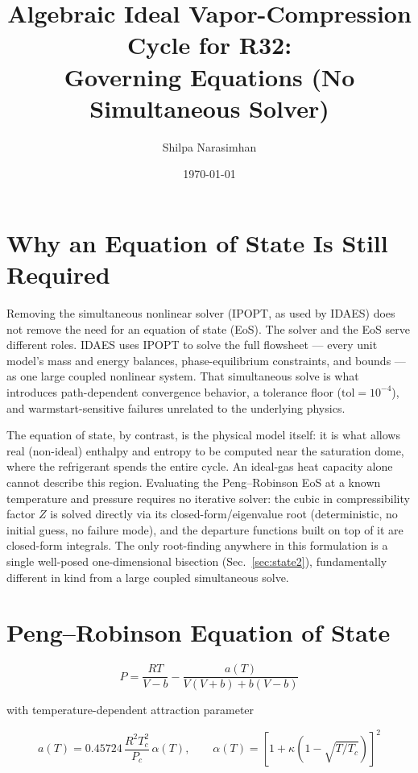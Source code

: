 \documentclass[11pt]{article}
\title{Algebraic Ideal Vapor-Compression Cycle for R32:\\
Governing Equations (No Simultaneous Solver)}
\author{Shilpa Narasimhan}
\date{\today}
\begin{document}
\maketitle

\section{Why an Equation of State Is Still Required}

Removing the simultaneous nonlinear solver (IPOPT, as used by IDAES) does not
remove the need for an equation of state (EoS). The solver and the EoS serve
different roles. IDAES uses IPOPT to solve the full flowsheet --- every unit
model's mass and energy balances, phase-equilibrium constraints, and bounds
--- as one large coupled nonlinear system. That simultaneous solve is what
introduces path-dependent convergence behavior, a tolerance floor
($\text{tol}=10^{-4}$), and warmstart-sensitive failures unrelated to the
underlying physics.

The equation of state, by contrast, is the physical model itself: it is what
allows real (non-ideal) enthalpy and entropy to be computed near the
saturation dome, where the refrigerant spends the entire cycle. An
ideal-gas heat capacity alone cannot describe this region. Evaluating the
Peng--Robinson EoS at a known temperature and pressure requires no iterative
solver: the cubic in compressibility factor $Z$ is solved directly via its
closed-form/eigenvalue root (deterministic, no initial guess, no failure
mode), and the departure functions built on top of it are closed-form
integrals. The only root-finding anywhere in this formulation is a single
well-posed one-dimensional bisection (Sec.~\ref{sec:state2}), fundamentally
different in kind from a large coupled simultaneous solve.

\section{Peng--Robinson Equation of State}

\begin{equation}
P = \frac{RT}{V-b} - \frac{a(T)}{V(V+b) + b(V-b)}
\end{equation}

with temperature-dependent attraction parameter

\begin{equation}
a(T) = 0.45724\,\frac{R^2 T_c^2}{P_c}\,\alpha(T), \qquad
\alpha(T) = \left[1 + \kappa\left(1 - \sqrt{T/T_c}\right)\right]^2
\end{equation}
\end{document}
